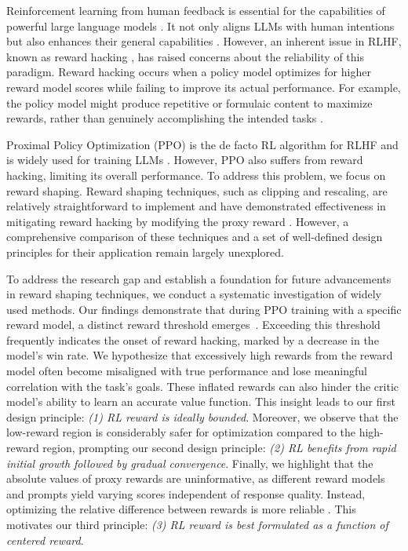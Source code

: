 

Reinforcement learning from human feedback is essential for the capabilities of powerful large language models \cite{Training-language-models-to-follow-instructions-with-human-feedback,openai2024gpt4technicalreport}. It not only aligns LLMs with human intentions \cite{bai2022traininghelpfulharmlessassistant} but also enhances their general capabilities \cite{guo2024deepseekcoderlargelanguagemodel}. However, an inherent issue in RLHF, known as reward hacking \citep{amodei2016concrete, gao2023scaling}, has raised concerns about the reliability of this paradigm. Reward hacking occurs when a policy model optimizes for higher reward model scores while failing to improve its actual performance. For example, the policy model might produce repetitive or formulaic content to maximize rewards, rather than genuinely accomplishing the intended tasks \citep{Singhal_Goyal_Xu_Durrett_2023}.

Proximal Policy Optimization (PPO) \citep{Schulman2017ProximalPO} is the de facto RL algorithm for RLHF and is widely used for training LLMs \citep{Training-language-models-to-follow-instructions-with-human-feedback}. However, PPO also suffers from reward hacking, limiting its overall performance. To address this problem, we focus on reward shaping. Reward shaping techniques, such as clipping and rescaling, are relatively straightforward to implement and have demonstrated effectiveness in mitigating reward hacking by modifying the proxy reward \citep{Dai2023SafeRS, Wang2024TransformingAC}. However, a comprehensive comparison of these techniques and a set of well-defined design principles for their application remain largely unexplored.

To address the research gap and establish a foundation for future advancements in reward shaping techniques, we conduct a systematic investigation of widely used methods. Our findings demonstrate that during PPO training with a specific reward model, a distinct reward threshold emerges~\cite{moskovitz2023confrontingrewardmodeloveroptimization}. Exceeding this threshold frequently indicates the onset of reward hacking, marked by a decrease in the model's win rate. We hypothesize that excessively high rewards from the reward model often become misaligned with true performance and lose meaningful correlation with the task's goals. These inflated rewards can also hinder the critic model's ability to learn an accurate value function. This insight leads to our first design principle: \emph{(1) RL reward is ideally bounded}. Moreover, we observe that the low-reward region is considerably safer for optimization compared to the high-reward region, prompting our second design principle: \emph{(2) RL benefits from rapid initial growth followed by gradual convergence}. Finally, we highlight that the absolute values of proxy rewards are uninformative, as different reward models and prompts yield varying scores independent of response quality. Instead, optimizing the relative difference between rewards is more reliable \cite{Wang2024TransformingAC}. This motivates our third principle: \emph{(3) RL reward is best formulated as a function of centered reward}.

